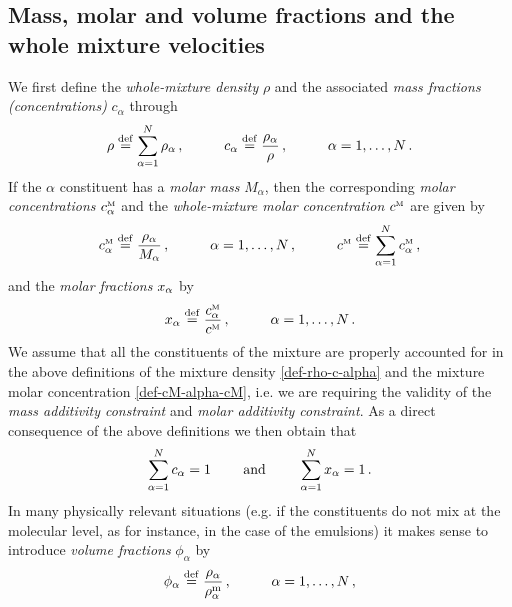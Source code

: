 \documentclass[a4paper]{article}
\begin{document}
\subsection{Mass,  molar and volume fractions and the whole mixture velocities}
\label{sec-definitions}
We first define the {\it whole-mixture density} $\rho$ and the associated {\it mass fractions (concentrations)} $c_\alpha$
through
\begin{align}
\label{def-rho-c-alpha}
\rho\stackrel{\mathrm{def}}{=}\sum_{\alpha=1}^N\rho_\alpha\,,\hspace{1cm}c_\alpha\stackrel{\mathrm{def}}{=}\frac{\rho_\alpha}{\rho}\,,\hspace{1cm}\alpha=1,\dots,N\,.
\end{align}
If the $\alpha$ constituent has a {\it molar mass} $M_\alpha$, then the corresponding {\it molar concentrations} $c^{\mbox{\tiny{M}}}_\alpha$ and the {\it whole-mixture molar concentration} $c^{\mbox{\tiny{M}}}$ are given by 
\begin{align}
\label{def-cM-alpha-cM}
c^{\mbox{\tiny{M}}}_\alpha\stackrel{\mathrm{def}}{=} \frac{\rho_\alpha}{M_\alpha}\,,\hspace{1cm}\alpha=1,\dots,N\,,\hspace{1cm}c^{\mbox{\tiny{M}}}\stackrel{\mathrm{def}}{=}\sum_{\alpha=1}^Nc^{\mbox{\tiny{M}}}_\alpha\,,
\end{align}
and the {\it molar fractions} $x_\alpha$ by
\begin{align}
x_\alpha\stackrel{\mathrm{def}}{=}\frac{c^{\mbox{\tiny{M}}}_\alpha}{c^{\mbox{\tiny{M}}}}\,,\hspace{1cm}\alpha=1,\dots,N\,.
\end{align}
We assume that all the constituents of the mixture are properly accounted for in the above definitions of the mixture density \eqref{def-rho-c-alpha} and the mixture molar concentration \eqref{def-cM-alpha-cM}, i.e. we are requiring the validity of the {\it mass additivity constraint} and {\it molar additivity constraint}. As a direct consequence of the above definitions we then obtain that
\begin{equation}
\label{def-mass-molar-additivity}
\sum_{\alpha=1}^N c_\alpha = 1\qquad \textrm{ and } \qquad\sum_{\alpha=1}^N x_\alpha = 1\,.
\end{equation}
In many physically relevant situations (e.g. if the constituents do not mix at the molecular level, as for instance, in the case of the emulsions) it makes sense to introduce {\it volume fractions} $\phi_\alpha$ by
\begin{equation}
\phi_\alpha \stackrel{\mathrm{def}}{=} \frac{\rho_\alpha}{\rho^{\rm m}_\alpha}\,,\hspace{1cm}\alpha=1,\dots,N\,,
    \end{equation}
\end{document}

